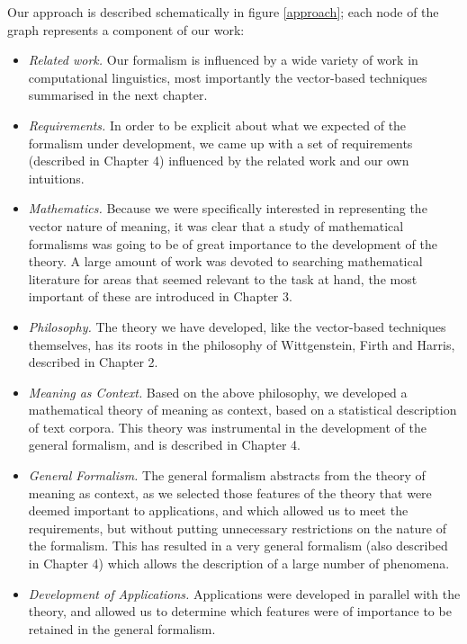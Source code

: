 \documentclass[12pt]{report}
\begin{document}
Our approach is described schematically in figure \ref{approach}; each node of the graph represents a component of our work:
\begin{itemize}
\item \emph{Related work.} Our formalism is influenced by a wide variety of work in computational linguistics, most importantly the vector-based techniques summarised in the next chapter.
\item \emph{Requirements.} In order to be explicit about what we expected of the formalism under development, we came up with a set of requirements (described in Chapter 4) influenced by the related work and our own intuitions.
\item \emph{Mathematics.} Because we were specifically interested in representing the vector nature of meaning, it was clear that a study of mathematical formalisms was going to be of great importance to the development of the theory. A large amount of work was devoted to searching mathematical literature for areas that seemed relevant to the task at hand, the most important of these are introduced in Chapter 3.
\item \emph{Philosophy.} The theory we have developed, like the vector-based techniques themselves, has its roots in the philosophy of Wittgenstein, Firth and Harris, described in Chapter 2.
\item \emph{Meaning as Context.} Based on the above philosophy, we developed a mathematical theory of meaning as context, based on a statistical description of text corpora. This theory was instrumental in the development of the general formalism, and is described in Chapter 4.
\item \emph{General Formalism.} The general formalism abstracts from the theory of meaning as context, as we selected those features of the theory that were deemed important to applications, and which allowed us to meet the requirements, but without putting unnecessary restrictions on the nature of the formalism. This has resulted in a very general formalism (also described in Chapter 4) which allows the description of a large number of phenomena.
\item \emph{Development of Applications.} Applications were developed in parallel with the theory, and allowed us to determine which features were of importance to be retained in the general formalism.
\end{itemize}
\end{document}
